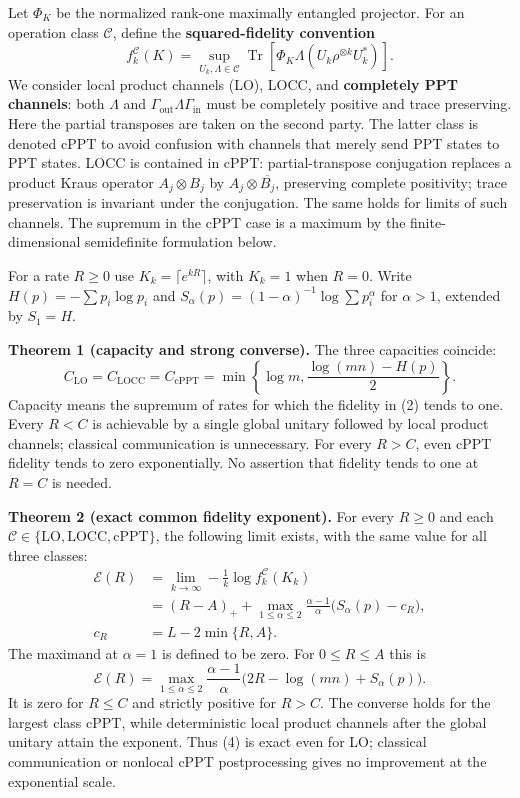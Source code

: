\documentclass[11pt]{article}
\begin{document}
Let \(\Phi_K\) be the normalized rank-one maximally entangled projector. For an operation class \(\mathcal C\), define the \textbf{squared-fidelity convention} \[
 f_k^{\mathcal C}(K)=\sup_{U_k,\Lambda\in\mathcal C}
 \operatorname{Tr}\!\left[\Phi_K\Lambda(U_k\rho^{\otimes k}U_k^*)\right].
 \tag{2}
\] We consider local product channels (LO), LOCC, and \textbf{completely PPT channels}: both \(\Lambda\) and \(\Gamma_{\mathrm{out}}\Lambda\Gamma_{\mathrm{in}}\) must be completely positive and trace preserving. Here the partial transposes are taken on the second party. The latter class is denoted \(\mathrm{cPPT}\) to avoid confusion with channels that merely send PPT states to PPT states. LOCC is contained in cPPT: partial-transpose conjugation replaces a product Kraus operator \(A_j\otimes B_j\) by \(A_j\otimes\overline{B_j}\), preserving complete positivity; trace preservation is invariant under the conjugation. The same holds for limits of such channels. The supremum in the cPPT case is a maximum by the finite-dimensional semidefinite formulation below.

For a rate \(R\ge0\) use \(K_k=\lceil e^{kR}\rceil\), with \(K_k=1\) when \(R=0\). Write \(H(p)=-\sum p_i\log p_i\) and \(S_\alpha(p)=(1-\alpha)^{-1}\log\sum p_i^\alpha\) for \(\alpha>1\), extended by \(S_1=H\).

\textbf{Theorem 1 (capacity and strong converse).} The three capacities coincide: \[
 \boxed{C_{\mathrm{LO}}=C_{\mathrm{LOCC}}=C_{\mathrm{cPPT}}
 =\min\left\{\log m,\frac{\log(mn)-H(p)}2\right\}.}
 \tag{3}
\] Capacity means the supremum of rates for which the fidelity in (2) tends to one. Every \(R<C\) is achievable by a single global unitary followed by local product channels; classical communication is unnecessary. For every \(R>C\), even cPPT fidelity tends to zero exponentially. No assertion that fidelity tends to one at \(R=C\) is needed.

\textbf{Theorem 2 (exact common fidelity exponent).} For every \(R\ge0\) and each \(\mathcal C\in\{\mathrm{LO},\mathrm{LOCC},\mathrm{cPPT}\}\), the following limit exists, with the same value for all three classes: \[
 \boxed{\begin{aligned}
 \mathcal E(R)&=\lim_{k\to\infty}-\frac1k\log f_k^{\mathcal C}(K_k)\\
 &=(R-A)_++\max_{1\le\alpha\le2}
 \frac{\alpha-1}{\alpha}\bigl(S_\alpha(p)-c_R\bigr),\\
 c_R&=L-2\min\{R,A\}.
 \end{aligned}}
 \tag{4}
\] The maximand at \(\alpha=1\) is defined to be zero. For \(0\le R\le A\) this is \[
 \mathcal E(R)=\max_{1\le\alpha\le2}
 \frac{\alpha-1}{\alpha}\bigl(2R-\log(mn)+S_\alpha(p)\bigr).
 \tag{5}
\] It is zero for \(R\le C\) and strictly positive for \(R>C\). The converse holds for the largest class cPPT, while deterministic local product channels after the global unitary attain the exponent. Thus (4) is exact even for LO; classical communication or nonlocal cPPT postprocessing gives no improvement at the exponential scale.
\end{document}
